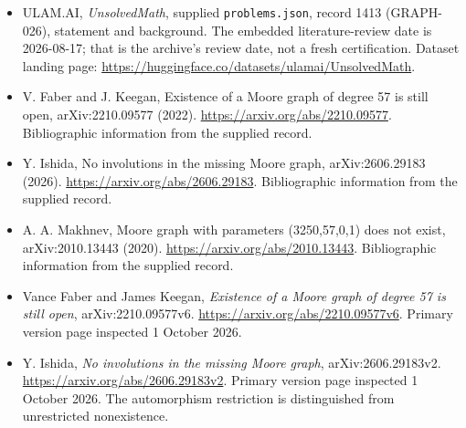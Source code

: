 \documentclass[11pt,a4paper]{article}
\begin{document}
{\small

\begin{itemize}

\item[\hypertarget{source:1413:1}{S1}] ULAM.AI, \emph{UnsolvedMath}, supplied \texttt{problems.json}, record 1413 (GRAPH-026), statement and background. The embedded literature-review date is 2026-08-17; that is the archive’s review date, not a fresh certification. Dataset landing page: \url{https://huggingface.co/datasets/ulamai/UnsolvedMath}.

\item[\hypertarget{source:1413:2}{S2}] V. Faber and J. Keegan, Existence of a Moore graph of degree 57 is still open, arXiv:2210.09577 (2022). \url{https://arxiv.org/abs/2210.09577}. Bibliographic information from the supplied record.

\item[\hypertarget{source:1413:3}{S3}] Y. Ishida, No involutions in the missing Moore graph, arXiv:2606.29183 (2026). \url{https://arxiv.org/abs/2606.29183}. Bibliographic information from the supplied record.

\item[\hypertarget{source:1413:4}{S4}] A. A. Makhnev, Moore graph with parameters (3250,57,0,1) does not exist, arXiv:2010.13443 (2020). \url{https://arxiv.org/abs/2010.13443}. Bibliographic information from the supplied record.


\item[E1] Vance Faber and James Keegan,
\emph{Existence of a Moore graph of degree 57 is still open},
arXiv:2210.09577v6. \url{https://arxiv.org/abs/2210.09577v6}.
Primary version page inspected 1 October 2026.
\item[E2] Y. Ishida, \emph{No involutions in the missing Moore graph},
arXiv:2606.29183v2. \url{https://arxiv.org/abs/2606.29183v2}.
Primary version page inspected 1 October 2026. The automorphism
restriction is distinguished from unrestricted nonexistence.

\end{itemize}

}

\label{end:1413}
\end{document}
